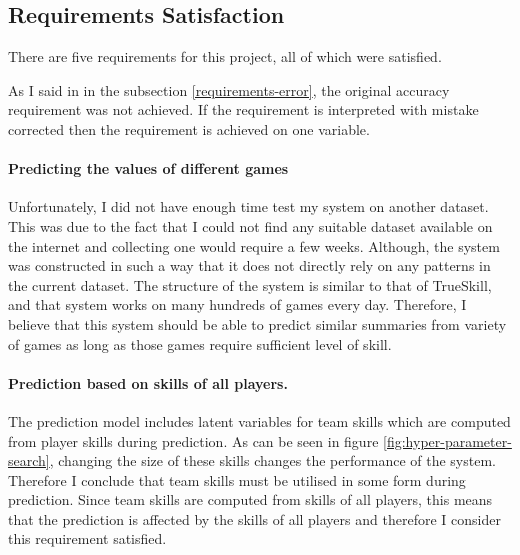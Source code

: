 \documentclass[12pt,a4paper]{book}
\begin{document}
\subsection{Requirements Satisfaction}
There are five requirements for this project, all of which were satisfied.

As I said in in the subsection \ref{requirements-error}, the original accuracy requirement was not achieved.
If the requirement is interpreted with mistake corrected then the requirement is achieved on one variable.

\paragraph{Predicting the values of different games}
Unfortunately, I did not have enough time test my system on another dataset.
This was due to the fact that I could not find any suitable dataset available on the internet and collecting one would require a few weeks.
Although, the system was constructed in such a way that it does not directly rely on any patterns in the current dataset.
The structure of the system is similar to that of TrueSkill, and that system works on many hundreds of games every day.
Therefore, I believe that this system should be able to predict similar summaries from variety of games as long as those games require sufficient level of skill.

\paragraph{Prediction based on skills of all players.}
The prediction model includes latent variables for team skills which are computed from player skills during prediction.
As can be seen in figure \ref{fig:hyper-parameter-search}, changing the size of these skills changes the performance of the system.
Therefore I conclude that team skills must be utilised in some form during prediction.
Since team skills are computed from skills of all players, this means that the prediction is affected by the skills of all players and therefore I consider this requirement satisfied.
\end{document}
